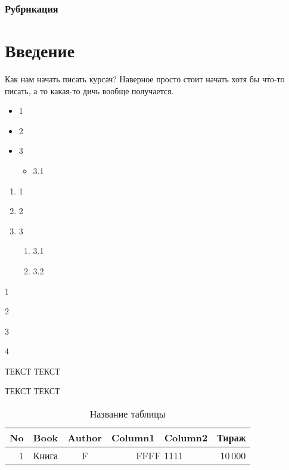 \documentclass [a4paper,oneside,final,14pt]{extarticle}
\begin{document}
\normalfont

\subsection{Рубрикация}

\chapter{Введение}


Как нам начать писать курсач? Наверное просто стоит начать хотя бы что-то писать, а то какая-то дичь вообще получается.



\begin{itemize}
	\item 1
	\item 2
	\item 3
	\begin{itemize}
	\item 3.1
	\end{itemize}
\end{itemize}

\begin{enumerate}
	\item 1
	\item 2
	\item 3
	\begin{enumerate}
		\item 3.1
		\item 3.2
	\end{enumerate}
\end{enumerate}

\begin{compactlist}
	\item 1
	\item 2
	\item 3
	\item 4
\end{compactlist}



ТЕКСТ ТЕКСТ \cite{kniga1}

ТЕКСТ ТЕКСТ \cite{kniga2}




\begin{table}[t]
	\centering
	\begin{tabular}
		{|r|c|c|c|c|r|}
		\hline No & Book & Author & Column1 & Column2 & Тираж \\ \hline 
		1 & Книга &  F & \multicolumn{2}{c|}{FFFF 1111} & 10\,000 \\ \hline 
	\end{tabular}
	\caption{Название таблицы}
	\label{table1}
\end{table}
\end{document}

